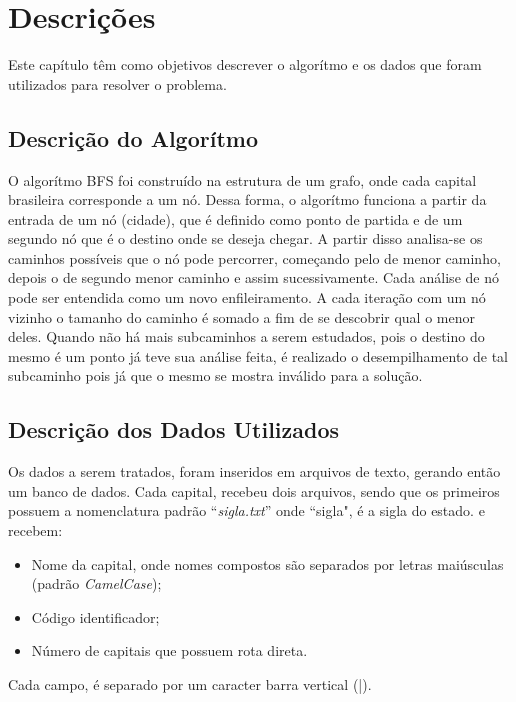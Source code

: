 \chapter*[Descrições]{Descrições}

Este capítulo têm como objetivos descrever o algorítmo e os dados que foram utilizados para resolver o problema.

\section{Descrição do Algorítmo}

O algorítmo BFS foi construído na estrutura de um grafo, onde cada capital brasileira corresponde a um nó. 
Dessa forma, o algorítmo funciona a partir da entrada de um nó (cidade), que é definido como ponto de 
partida e de um segundo nó que é o destino onde se deseja chegar. A partir disso analisa-se os caminhos possíveis que o nó pode percorrer, começando pelo de menor caminho, depois o de segundo menor caminho e assim sucessivamente. Cada análise de nó pode ser entendida como um novo enfileiramento. A cada iteração com um nó vizinho o tamanho do caminho é somado a fim de se descobrir qual o menor deles. Quando não há mais subcaminhos a serem estudados, pois o destino do mesmo é um ponto já teve sua análise feita, é realizado o desempilhamento de tal subcaminho pois já que o mesmo se mostra inválido para a solução.

\section{Descrição dos Dados Utilizados}

Os dados a serem tratados, foram inseridos em arquivos de texto, gerando então um banco de dados. Cada 
capital, recebeu dois arquivos, sendo que os primeiros possuem a nomenclatura padrão ``\textit{sigla.txt}'' onde ``sigla", é a sigla do estado.
e recebem: 

\begin{itemize}
 	\item Nome da capital, onde nomes compostos são separados por letras maiúsculas (padrão \textit{CamelCase});
    \item Código identificador;
	\item Número de capitais que possuem rota direta. 
\end{itemize}

Cada campo, é separado por um caracter barra vertical (|). 

